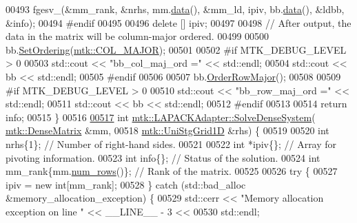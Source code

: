 \begin{DoxyCode}
00493   fgesv\_(&mm\_rank, &nrhs, mm.\hyperlink{classmtk_1_1DenseMatrix_a0c33b8a9e01d157c61ddbdf807c25d84}{data}(), &mm\_ld, ipiv, bb.\hyperlink{classmtk_1_1DenseMatrix_a0c33b8a9e01d157c61ddbdf807c25d84}{data}(), &ldbb, &info);
00494 \textcolor{preprocessor}{  #endif}
00495 
00496   \textcolor{keyword}{delete} [] ipiv;
00497 
00498   \textcolor{comment}{// After output, the data in the matrix will be column-major ordered.}
00499 
00500   bb.\hyperlink{classmtk_1_1DenseMatrix_a178e63f365cf8c547dc5020c60357f5e}{SetOrdering}(\hyperlink{namespacemtk_ga622801bd9f912d0f976c3e383f5f581ca7c11989c132253fb76b8f6b1314f7e13}{mtk::COL\_MAJOR});
00501 
00502 \textcolor{preprocessor}{  #if MTK\_DEBUG\_LEVEL > 0}
00503   std::cout << \textcolor{stringliteral}{"bb\_col\_maj\_ord ="} << std::endl;
00504   std::cout << bb << std::endl;
00505 \textcolor{preprocessor}{  #endif}
00506 
00507   bb.\hyperlink{classmtk_1_1DenseMatrix_ac2949efba3e8278335d45418c85433e4}{OrderRowMajor}();
00508 
00509 \textcolor{preprocessor}{  #if MTK\_DEBUG\_LEVEL > 0}
00510   std::cout << \textcolor{stringliteral}{"bb\_row\_maj\_ord ="} << std::endl;
00511   std::cout << bb << std::endl;
00512 \textcolor{preprocessor}{  #endif}
00513 
00514   \textcolor{keywordflow}{return} info;
00515 \}
00516 
\hypertarget{mtk__lapack__adapter_8cc_source_l00517}{}\hyperlink{classmtk_1_1LAPACKAdapter_ac38be1e30a2456b2a14c8a81f47c4ba1}{00517} \textcolor{keywordtype}{int} \hyperlink{classmtk_1_1LAPACKAdapter_a7428bccf74fd4a4af68fb7233846da22}{mtk::LAPACKAdapter::SolveDenseSystem}(
      \hyperlink{classmtk_1_1DenseMatrix}{mtk::DenseMatrix} &mm,
00518                                          \hyperlink{classmtk_1_1UniStgGrid1D}{mtk::UniStgGrid1D} &rhs) \{
00519 
00520   \textcolor{keywordtype}{int} nrhs\{1\};  \textcolor{comment}{// Number of right-hand sides.}
00521 
00522   \textcolor{keywordtype}{int} *ipiv\{\};                \textcolor{comment}{// Array for pivoting information.}
00523   \textcolor{keywordtype}{int} info\{\};                 \textcolor{comment}{// Status of the solution.}
00524   \textcolor{keywordtype}{int} mm\_rank\{mm.\hyperlink{classmtk_1_1DenseMatrix_a53f3afb3b6a8d21854458aaa9663cc74}{num\_rows}()\}; \textcolor{comment}{// Rank of the matrix.}
00525 
00526   \textcolor{keywordflow}{try} \{
00527     ipiv = \textcolor{keyword}{new} \textcolor{keywordtype}{int}[mm\_rank];
00528   \} \textcolor{keywordflow}{catch} (std::bad\_alloc &memory\_allocation\_exception) \{
00529     std::cerr << \textcolor{stringliteral}{"Memory allocation exception on line "} << \_\_LINE\_\_ - 3 <<
00530       std::endl;

\end{DoxyCode}
